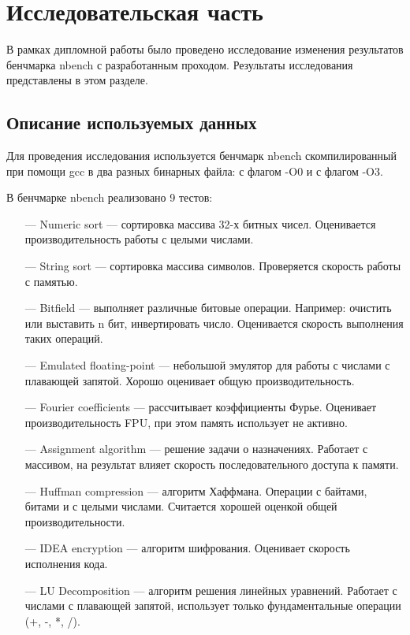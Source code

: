 \section{Исследовательская часть}

В рамках дипломной работы было проведено исследование изменения результатов бенчмарка nbench \cite{nbench} с разработанным проходом. Результаты исследования представлены в этом разделе.

\subsection{Описание используемых данных}

Для проведения исследования используется бенчмарк nbench скомпилированный при помощи gcc в два разных бинарных файла: с флагом -O0 и с флагом -O3.

В бенчмарке nbench реализовано 9 тестов:

\begin{itemize}[leftmargin=1.6\parindent]
	\item[---] Numeric sort --- сортировка массива 32-х битных чисел. Оценивается производительность работы с целыми числами.
	\item[---] String sort --- сортировка массива символов. Проверяется скорость работы с памятью.
	\item[---] Bitfield --- выполняет различные битовые операции. Например: очистить или выставить n бит, инвертировать число. Оценивается скорость выполнения таких операций.
	\item[---] Emulated floating-point --- небольшой эмулятор для работы с числами с плавающей запятой. Хорошо оценивает общую производительность.
	\item[---] Fourier coefficients --- рассчитывает коэффициенты Фурье. Оценивает производительность FPU, при этом память использует не активно.
	\item[---] Assignment algorithm --- решение задачи о назначениях. Работает с массивом, на результат влияет скорость последовательного доступа к памяти.
	\item[---] Huffman compression --- алгоритм Хаффмана. Операции с байтами, битами и с целыми числами. Считается хорошей оценкой общей производительности.
	\item[---] IDEA encryption --- алгоритм шифрования. Оценивает скорость исполнения кода.
	\item[---] LU Decomposition ---  алгоритм решения линейных уравнений. Работает с числами с плавающей запятой, использует только фундаментальные операции (+, -, *, /).
\end{itemize}

